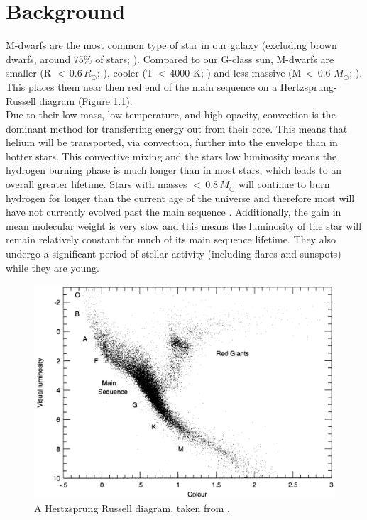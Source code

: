 \chapter{Background}
\label{chapBackground}
M-dwarfs are the most common type of star in our galaxy (excluding brown dwarfs, around 75\% of stars; \citealt{2007Tarter}). Compared to our G-class sun, M-dwarfs are smaller (R $<$\,0.6\,$R_{\odot}$; \citealt{2009Kaltenegger}), cooler (T\,$<$\,4000 K; \citealt{2009Kaltenegger}) and less massive (M\,$<$\,0.6 $M_{\odot}$; \citealt{2009Kaltenegger}). This places them near then red end of the main sequence on a Hertzsprung-Russell diagram (Figure \ref{HRFig}).\\

Due to their low mass, low temperature, and high opacity, convection is the dominant method for transferring energy out from their core. This means that helium will be transported, via convection, further into the envelope than in hotter stars. This convective mixing and the stars low luminosity means the hydrogen burning phase is much longer than in most stars, which leads to an overall greater lifetime. Stars with masses $<$\,0.8\,$M_{\odot}$ will continue to burn hydrogen for longer than the current age of the universe and therefore most will have not currently evolved past the main sequence \citep{1997Adams}. Additionally, the gain in mean molecular weight is very slow \citep{2007Tarter} and this means the luminosity of the star will remain relatively constant for much of its main sequence lifetime. They also undergo a significant period of stellar activity (including flares and sunspots) while they are young.\\

\begin{figure}[!ht]
\centering
\includegraphics[width=\textwidth]{HRDiagram.png}
\caption{A Hertzsprung Russell diagram, taken from \citet{2005Reid}.}
\label{HRFig}
\end{figure}


